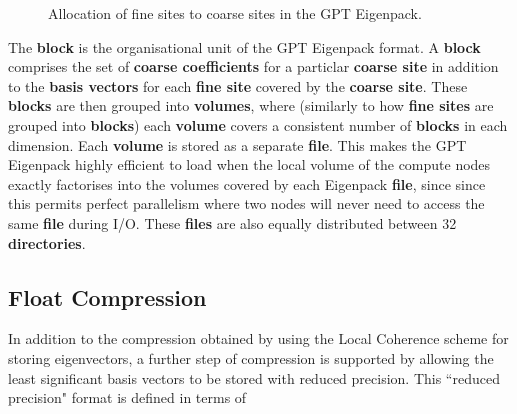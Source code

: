 \documentclass{article}
\begin{document}
\begin{figure}
\label{FIGURE::LocalCoherenceCoarsening}
\begin{center}
\end{center}
\caption{Allocation of fine sites to coarse sites in the GPT Eigenpack.}
\end{figure}
\noindent
The \textbf{block} is the organisational unit of the GPT Eigenpack format. A \textbf{block} comprises the set of \textbf{coarse coefficients} for a particlar \textbf{coarse site} in addition to the \textbf{basis vectors} for each \textbf{fine site} covered by the \textbf{coarse site}. These \textbf{blocks} are then grouped into \textbf{volumes}, where (similarly to how \textbf{fine sites} are grouped into \textbf{blocks}) each \textbf{volume} covers a consistent number of \textbf{blocks} in each dimension. Each \textbf{volume} is stored as a separate \textbf{file}. This makes the GPT Eigenpack highly efficient to load when the local volume of the compute nodes exactly factorises into the volumes covered by each Eigenpack \textbf{file}, since since this permits perfect parallelism where two nodes will never need to access the same \textbf{file} during I/O. These \textbf{files} are also equally distributed between 32 \textbf{directories}.

\subsection{Float Compression}
In addition to the compression obtained by using the Local Coherence scheme for storing eigenvectors, a further step of compression is supported by allowing the least significant basis vectors to be stored with reduced precision. This ``reduced precision" format is defined in terms of 
\end{document}
